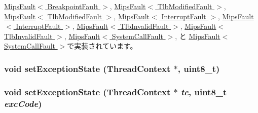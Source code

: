 \hyperlink{classMipsISA_1_1MipsFault_a9c059b781f653170e9da1d520c6d96b1}{MipsFault$<$ BreakpointFault $>$}, \hyperlink{classMipsISA_1_1MipsFault_a9c059b781f653170e9da1d520c6d96b1}{MipsFault$<$ TlbModifiedFault $>$}, \hyperlink{classMipsISA_1_1MipsFault_a9c059b781f653170e9da1d520c6d96b1}{MipsFault$<$ TlbModifiedFault $>$}, \hyperlink{classMipsISA_1_1MipsFault_a9c059b781f653170e9da1d520c6d96b1}{MipsFault$<$ InterruptFault $>$}, \hyperlink{classMipsISA_1_1MipsFault_a9c059b781f653170e9da1d520c6d96b1}{MipsFault$<$ InterruptFault $>$}, \hyperlink{classMipsISA_1_1MipsFault_a9c059b781f653170e9da1d520c6d96b1}{MipsFault$<$ TlbInvalidFault $>$}, \hyperlink{classMipsISA_1_1MipsFault_a9c059b781f653170e9da1d520c6d96b1}{MipsFault$<$ TlbInvalidFault $>$}, \hyperlink{classMipsISA_1_1MipsFault_a9c059b781f653170e9da1d520c6d96b1}{MipsFault$<$ SystemCallFault $>$}, と \hyperlink{classMipsISA_1_1MipsFault_a9c059b781f653170e9da1d520c6d96b1}{MipsFault$<$ SystemCallFault $>$}で実装されています。\hypertarget{classMipsISA_1_1MipsFaultBase_a8254d2aa7a98db60b019665d8542442c}{
\subsubsection[{setExceptionState}]{\setlength{\rightskip}{0pt plus 5cm}void setExceptionState ({\bf ThreadContext} $\ast$, \/  uint8\_\-t)}}
\label{classMipsISA_1_1MipsFaultBase_a8254d2aa7a98db60b019665d8542442c}
\hypertarget{classMipsISA_1_1MipsFaultBase_a8254d2aa7a98db60b019665d8542442c}{
\subsubsection[{setExceptionState}]{\setlength{\rightskip}{0pt plus 5cm}void setExceptionState ({\bf ThreadContext} $\ast$ {\em tc}, \/  uint8\_\-t {\em excCode})}}
\label{classMipsISA_1_1MipsFaultBase_a8254d2aa7a98db60b019665d8542442c}



